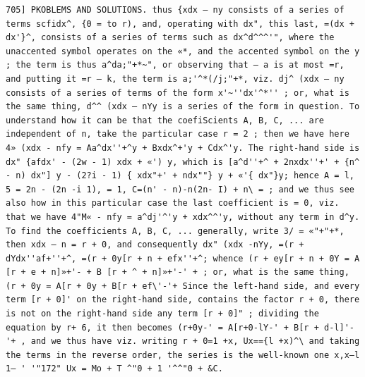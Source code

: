 \documentclass[12pt]{article}
\theoremstyle{plain}
\begin{document}
\newpage
\setcounter{page}{591}
\begin{verbatim}
705] PKOBLEMS AND SOLUTIONS. thus {xdx — ny consists of a series of terms scfidx^, {0 = to r), and, operating with dx", this last, =(dx + dx'}^, consists of a series of terms such as dx^d^^^'", where the unaccented symbol operates on the «*, and the accented symbol on the y ; the term is thus a^da;"+*~", or observing that — a is at most =r, and putting it =r — k, the term is a;'^*(/j;"+*, viz. dj^ (xdx — ny consists of a series of terms of the form x'~''dx'^*'' ; or, what is the same thing, d^^ (xdx — nYy is a series of the form in question. To understand how it can be that the coefiScients A, B, C, ... are independent of n, take the particular case r = 2 ; then we have here 4» (xdx - nfy = Aa^dx''+^y + Bxdx^+'y + Cdx^'y. The right-hand side is dx" {afdx' - (2w - 1) xdx + «') y, which is [a^d''+^ + 2nxdx''+' + {n^ - n) dx"] y - (2?i - 1) { xdx"+' + ndx""} y + «'{ dx"}y; hence A = l, 5 = 2n - (2n -i 1), = 1, C=(n' - n)-n(2n- I) + n\ = ; and we thus see also how in this particular case the last coefficient is = 0, viz. that we have 4"M« - nfy = a^dj'^'y + xdx^^'y, without any term in d^y. To find the coefficients A, B, C, ... generally, write 3/ = «"+"+*, then xdx — n = r + 0, and consequently dx" (xdx -nYy, =(r + dYdx''af+''+^, =(r + 0y[r + n + efx''+^; whence (r + ey[r + n + 0Y = A [r + e + n]»+'- + B [r + ^ + n]»+'-' + ; or, what is the same thing, (r + 0y = A[r + 0y + B[r + ef\'-'+ Since the left-hand side, and every term [r + 0]' on the right-hand side, contains the factor r + 0, there is not on the right-hand side any term [r + 0]" ; dividing the equation by r+ 6, it then becomes (r+0y-' = A[r+0-lY-' + B[r + d-l]'-'+ , and we thus have viz. writing r + 0=1 +x, Ux=={l +x)^\ and taking the terms in the reverse order, the series is the well-known one x,x—l 1— ' '"172" Ux = Mo + T ^"0 + 1 '^^"0 + &C. 
\end{verbatim}
\end{document}
